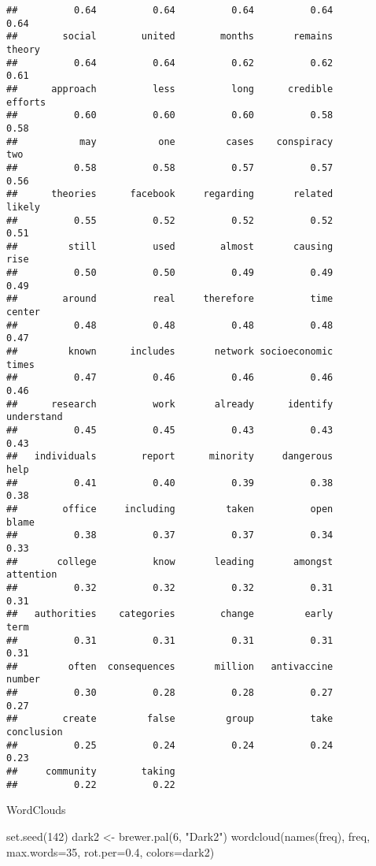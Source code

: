 \documentclass[
]{book}
\newenvironment{Shaded}{\begin{snugshade}}{\end{snugshade}}
\newcommand{\AttributeTok}[1]{\textcolor[rgb]{0.77,0.63,0.00}{#1}}
\newcommand{\DecValTok}[1]{\textcolor[rgb]{0.00,0.00,0.81}{#1}}
\newcommand{\FloatTok}[1]{\textcolor[rgb]{0.00,0.00,0.81}{#1}}
\newcommand{\FunctionTok}[1]{\textcolor[rgb]{0.00,0.00,0.00}{#1}}
\newcommand{\NormalTok}[1]{#1}
\newcommand{\OtherTok}[1]{\textcolor[rgb]{0.56,0.35,0.01}{#1}}
\newcommand{\StringTok}[1]{\textcolor[rgb]{0.31,0.60,0.02}{#1}}
\begin{document}
\begin{verbatim}
##          0.64          0.64          0.64          0.64          0.64 
##        social        united        months       remains        theory 
##          0.64          0.64          0.62          0.62          0.61 
##      approach          less          long      credible       efforts 
##          0.60          0.60          0.60          0.58          0.58 
##           may           one         cases    conspiracy           two 
##          0.58          0.58          0.57          0.57          0.56 
##      theories      facebook     regarding       related        likely 
##          0.55          0.52          0.52          0.52          0.51 
##         still          used        almost       causing          rise 
##          0.50          0.50          0.49          0.49          0.49 
##        around          real     therefore          time        center 
##          0.48          0.48          0.48          0.48          0.47 
##         known      includes       network socioeconomic         times 
##          0.47          0.46          0.46          0.46          0.46 
##      research          work       already      identify    understand 
##          0.45          0.45          0.43          0.43          0.43 
##   individuals        report      minority     dangerous          help 
##          0.41          0.40          0.39          0.38          0.38 
##        office     including         taken          open         blame 
##          0.38          0.37          0.37          0.34          0.33 
##       college          know       leading       amongst     attention 
##          0.32          0.32          0.32          0.31          0.31 
##   authorities    categories        change         early          term 
##          0.31          0.31          0.31          0.31          0.31 
##         often  consequences       million   antivaccine        number 
##          0.30          0.28          0.28          0.27          0.27 
##        create         false         group          take    conclusion 
##          0.25          0.24          0.24          0.24          0.23 
##     community        taking 
##          0.22          0.22
\end{verbatim}

WordClouds

\begin{Shaded}
\begin{Highlighting}[]
\FunctionTok{set.seed}\NormalTok{(}\DecValTok{142}\NormalTok{)}
\NormalTok{dark2 }\OtherTok{\textless{}{-}} \FunctionTok{brewer.pal}\NormalTok{(}\DecValTok{6}\NormalTok{, }\StringTok{"Dark2"}\NormalTok{)}
\FunctionTok{wordcloud}\NormalTok{(}\FunctionTok{names}\NormalTok{(freq), freq, }\AttributeTok{max.words=}\DecValTok{35}\NormalTok{, }\AttributeTok{rot.per=}\FloatTok{0.4}\NormalTok{, }\AttributeTok{colors=}\NormalTok{dark2)}
\end{Highlighting}
\end{Shaded}
\end{document}
